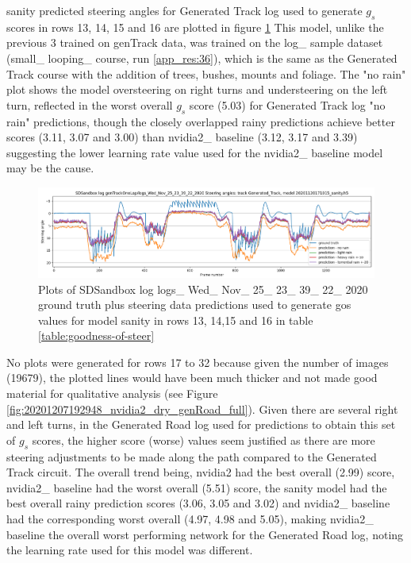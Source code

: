 sanity predicted steering angles for Generated Track log used to generate $g_s$ scores in rows 13, 14, 15 and 16 are plotted in figure \ref{fig:sa_Generated_Track_20201120171015_sanity.h5} 
This model, unlike the previous 3 trained on genTrack data, was trained on the log\_ sample dataset (small\_ looping\_ course, run \ref{app_res:36}), which is the same as the Generated Track course with the addition of trees, bushes, mounts and foliage. The "no rain" plot shows the model oversteering on right turns and understeering on the left turn, reflected in the worst overall $g_s$ score (5.03) for Generated Track log "no rain" predictions, though the closely overlapped rainy predictions achieve better scores (3.11, 3.07 and 3.00) than nvidia2\_ baseline (3.12, 3.17 and 3.39) suggesting the lower learning rate value used for the nvidia2\_ baseline model may be the cause.

\begin{figure}[h!]
 \centering 
 \includegraphics[width=\textwidth]{Figures/sa_Generated_Track_20201120171015_sanity.h5.png}
 \caption{Plots of SDSandbox log logs\_ Wed\_ Nov\_ 25\_ 23\_ 39\_ 22\_ 2020 ground truth plus steering data predictions used to generate gos values for model sanity in rows 13, 14,15  and 16 in table \ref{table:goodness-of-steer}}
 \label{fig:sa_Generated_Track_20201120171015_sanity.h5} 
\end{figure}

No plots were generated for rows 17 to 32 because given the number of images (19679), the plotted lines would have been much thicker and not made good material for qualitative analysis (see Figure  \ref{fig:20201207192948_nvidia2_dry_genRoad_full}). Given there are several right and left turns, in the Generated Road log used for predictions to obtain this set of $g_s$ scores, the higher score (worse) values seem justified as there are more steering adjustments to be made along the path compared to the Generated Track circuit. The overall trend being, nvidia2 had the best overall (2.99) score, nvidia2\_ baseline had the worst overall (5.51) score, the sanity model had the best overall rainy prediction scores (3.06, 3.05 and 3.02) and nvidia2\_ baseline had the corresponding worst overall (4.97, 4.98 and 5.05), making nvidia2\_ baseline the overall worst performing network for the Generated Road log, noting the learning rate used for this model was different. 


